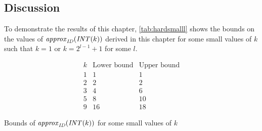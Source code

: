 \subsection{Discussion}

To demonstrate the results of this chapter,
\cref{tab:hardsmalll} shows the bounds on the values
of $\mathit{approx}_{\mathit{ID}} (\mathit{INT} (k))$ derived in this chapter
for some small values of $k$
such that $k=1$ or $k=2^{l-1}+1$ for some $l$.

\begin{table}[h]
\centering
$$\begin{array}{c|cc}
k %
& \text{Lower bound}
& \text{Upper bound}
\\
\hline
1 & 1 & 1 \\
2 & 2 & 2 \\ %
\hline
3 & 4 & 6 \\ %
5 & 8 & 10 \\ %
9 & 16 & 18 %
\end{array}$$
\caption{Bounds of $\mathit{approx}_{\mathit{ID}} (\mathit{INT} (k))$ for some small values of $k$}
\label{tab:hardsmalll}
\end{table}

